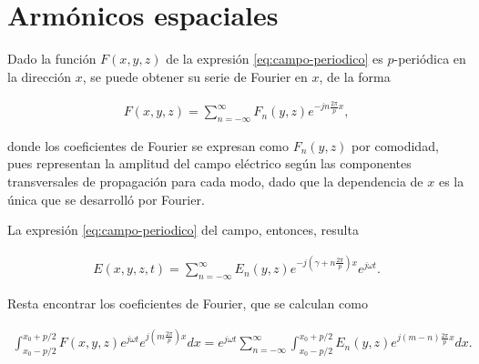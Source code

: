 

\section{Armónicos espaciales}

Dado la función $F(x,y,z)$ de la expresión \ref{eq:campo-periodico} es $p$-periódica en la dirección $x$, se puede obtener su serie de Fourier en $x$, de la forma

\begin{align}
F(x,y,z) = \sum_{n=-\infty}^{\infty} F_{n}(y,z) e^{-j n \frac{2\pi}{p} x},
\end{align}

donde los coeficientes de Fourier se expresan como $F_n(y,z)$ por comodidad, pues representan la amplitud del campo eléctrico según las componentes transversales de propagación para cada modo, dado que la dependencia de $x$ es la única que se desarrolló por Fourier. 

La expresión \ref{eq:campo-periodico} del campo, entonces, resulta

\begin{align}
E(x,y,z,t) = \sum_{n=-\infty}^{\infty} E_{n}(y,z) e^{-j \left(\gamma + n \frac{2\pi}{p}\right) x} e^{j\omega t}.
\end{align}

Resta encontrar los coeficientes de Fourier, que se calculan como

\begin{align}
\int_{x_0-p/2}^{x_0+p/2} F(x,y,z) e^{j\omega t} e^{j \left(m \frac{2\pi}{p}\right) x} dx = e^{j\omega t} \sum_{n=-\infty}^{\infty} \int_{x_0-p/2}^{x_0+p/2} E_{n}(y,z) e^{j (m-n) \frac{2\pi}{p} x} dx.
\end{align}

